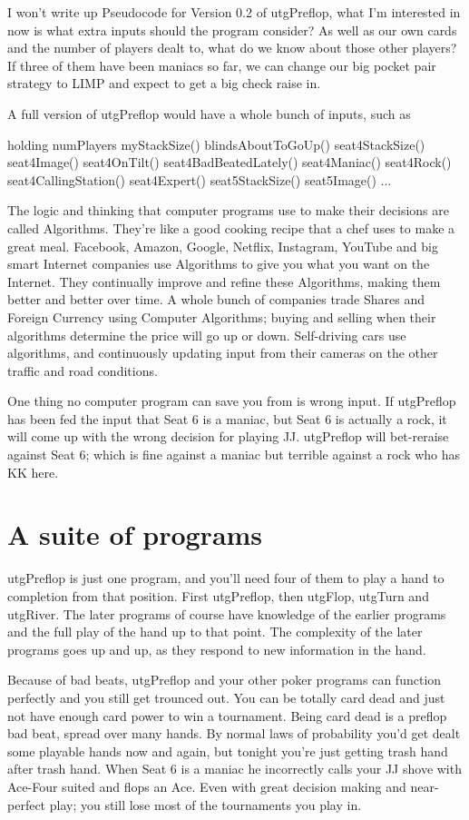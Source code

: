 I won't write up Pseudocode for Version 0.2 of utgPreflop, what I'm
interested in now is what extra inputs should the program consider?
As well as our own cards and the number of players dealt to, what do
we know about those other players? If three of them have been maniacs
so far, we can change our big pocket pair strategy to LIMP and expect
to get a big check raise in.

A full version of utgPreflop would have a whole bunch of inputs, such
as

holding
numPlayers
myStackSize()
blindsAboutToGoUp()
seat4StackSize()
seat4Image()
seat4OnTilt()
seat4BadBeatedLately()
seat4Maniac()
seat4Rock()
seat4CallingStation()
seat4Expert()
seat5StackSize()
seat5Image()
...

The logic and thinking that computer programs use to
make their decisions are called Algorithms. They're like a good
cooking recipe that a chef uses to make a great meal. Facebook,
Amazon, Google, Netflix, Instagram, YouTube and big smart Internet
companies use Algorithms to give you what you want on the Internet.
They continually improve and refine these Algorithms, making them
better and better over time. A whole bunch of companies trade Shares
and Foreign Currency using Computer Algorithms; buying and selling
when their algorithms determine the price will go up or down.
Self-driving cars use algorithms, and continuously updating input from
their cameras on the other traffic and road conditions.

One thing no computer program can save you from is wrong input.
If utgPreflop has been fed the input that Seat 6 is a maniac,
but Seat 6 is actually a rock, it will come up with the wrong decision
for playing JJ. utgPreflop will bet-reraise against Seat 6; which is
fine against a maniac but terrible against a rock who has KK here.


\section*{A suite of programs}

utgPreflop is just one program, and you'll need four of them to
play a hand to completion from that position. First utgPreflop,
then utgFlop, utgTurn and utgRiver. The later programs of course
have knowledge of the earlier programs and the full play of the hand
up to that point. The complexity of the later programs goes up and up,
as they respond to new information in the hand.

Because of bad beats, utgPreflop and your other poker programs can
function perfectly and you still get trounced out. You can be totally
card dead and just not have enough card power to win a
tournament. Being card dead is a preflop bad beat,
spread over many hands. By normal laws of probability you'd get dealt
some playable hands now and again, but tonight you're just getting
trash hand after trash hand. When Seat 6 is a maniac he incorrectly
calls your JJ shove with Ace-Four suited and flops an Ace. Even with
great decision making and near-perfect play; you still lose most of
the tournaments you play in.

